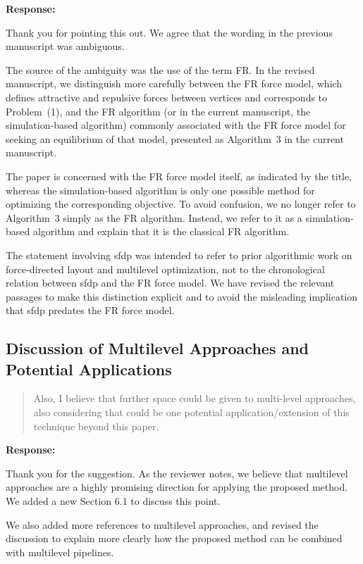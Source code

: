 \documentclass[11pt]{article}
\newcommand{\reviewercomment}[1]{%
  \begin{quote}
  \color{blue}
  #1
  \end{quote}
}
\newenvironment{response}{%
  \noindent\textbf{Response:}%
}{%
  \medskip
}
\begin{document}
\begin{response}
  Thank you for pointing this out.
  We agree that the wording in the previous manuscript was ambiguous.

  The source of the ambiguity was the use of the term FR. In the revised manuscript, we distinguish more carefully between the FR force model, which defines attractive and repulsive forces between vertices and corresponds to Problem~(1), and the FR algorithm (or in the current manuscript, the simulation-based algorithm) commonly associated with the FR force model for seeking an equilibrium of that model, presented as Algorithm~3 in the current manuscript.

  The paper is concerned with the FR force model itself, as indicated by the title, whereas the simulation-based algorithm is only one possible method for optimizing the corresponding objective. To avoid confusion, we no longer refer to Algorithm~3 simply as the FR algorithm. Instead, we refer to it as a simulation-based algorithm and explain that it is the classical FR algorithm.

  The statement involving \textsf{sfdp} was intended to refer to prior algorithmic work on force-directed layout and multilevel optimization, not to the chronological relation between \textsf{sfdp} and the FR force model. We have revised the relevant passages to make this distinction explicit and to avoid the misleading implication that \textsf{sfdp} predates the FR force model.
\end{response}

\subsection{Discussion of Multilevel Approaches and Potential Applications}

\reviewercomment{Also, I believe that further space could be given to multi-level approaches, also considering that could be one potential application/extension of this technique beyond this paper.}

\begin{response}
  Thank you for the suggestion.
  As the reviewer notes, we believe that multilevel approaches are a highly promising direction for applying the proposed method. We added a new Section 6.1 to discuss this point.

  We also added more references to multilevel approaches, and revised the discussion to explain more clearly how the proposed method can be combined with multilevel pipelines.
\end{response}
\end{document}

